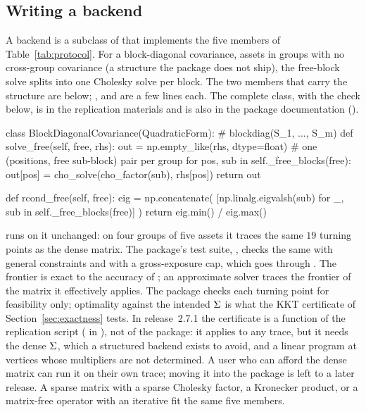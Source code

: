 \subsection{Writing a backend}
\label{sec:custom}

A backend is a subclass of  that implements the five members of
Table~\ref{tab:protocol}. For a block-diagonal covariance, assets in groups with no
cross-group covariance (a structure the package does not ship), the free-block solve
splits into one Cholesky solve per block. The two members that carry the structure are
below; ,  and  are a few lines each. The
complete class, with the check below, is  in the replication
materials and is also in the package documentation
().

\begin{CodeChunk}
\begin{CodeInput}
class BlockDiagonalCovariance(QuadraticForm):  # blockdiag(S_1, ..., S_m)
    def solve_free(self, free, rhs):
        out = np.empty_like(rhs, dtype=float)
        # one (positions, free sub-block) pair per group
        for pos, sub in self._free_blocks(free):
            out[pos] = cho_solve(cho_factor(sub), rhs[pos])
        return out

    def rcond_free(self, free):
        eig = np.concatenate(
            [np.linalg.eigvalsh(sub) for _, sub in self._free_blocks(free)]
        )
        return eig.min() / eig.max()
\end{CodeInput}
\end{CodeChunk}

 runs on it unchanged: on four groups of five assets it traces the same $19$
turning points as the dense matrix. The package's test suite,
, checks the same
with general constraints and with a gross-exposure cap, which goes through
.
The frontier is exact to the accuracy of ; an approximate solver
traces the frontier of the matrix it effectively applies. The package checks each
turning point for feasibility only; optimality against the intended $\Sigma$ is what the
KKT certificate of Section~\ref{sec:exactness} tests. In release~2.7.1 the certificate
is a function of the replication script ( in ),
not of the package: it applies to any trace, but it needs the dense $\Sigma$, which a
structured backend exists to avoid, and a linear program at vertices whose multipliers
are not determined. A user who can afford the dense matrix can run it on their own
trace; moving it into the package is left to a later release. A sparse matrix
with a sparse Cholesky factor, a Kronecker product, or a matrix-free operator with an
iterative  fit the same five members.
